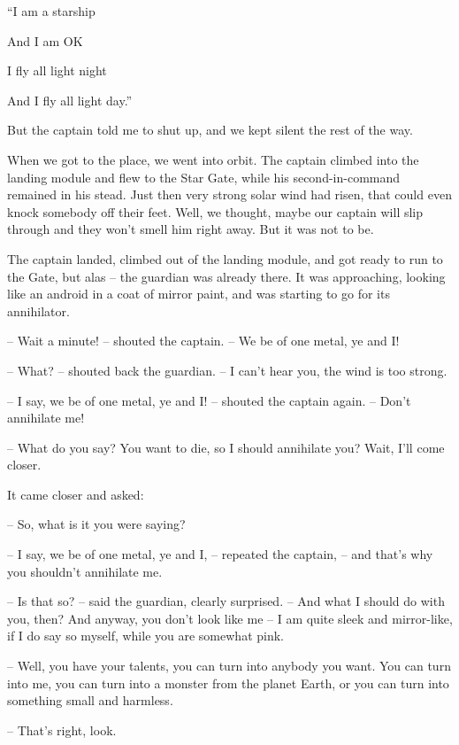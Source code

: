 \documentclass[ebook,oneside,final,openright]{memoir}
\begin{document}
“I am a starship \par
 And I am OK \par
 I fly all light night \par
 And I fly all light day.”\par
 But the captain told me to shut up, and we kept silent the rest of the way.\par
\par
When we got to the place, we went into orbit. The captain climbed into the landing module and flew to the Star Gate, while his second-in-command remained in his stead. Just then very strong solar wind had risen, that could even knock somebody off their feet. Well, we thought, maybe our captain will slip through and they won’t smell him right away. But it was not to be.\par
\par
The captain landed, climbed out of the landing module, and got ready to run to the Gate, but alas – the guardian was already there. It was approaching, looking like an android in a coat of mirror paint, and was starting to go for its annihilator.\par
– Wait a minute! – shouted the captain. – We be of one metal, ye and I!\par
– What? – shouted back the guardian. – I can’t hear you, the wind is too strong.\par
– I say, we be of one metal, ye and I! – shouted the captain again. – Don’t annihilate me!\par
– What do you say? You want to die, so I should annihilate you? Wait, I’ll come closer.\par
\par
It came closer and asked:\par
– So, what is it you were saying?\par
– I say, we be of one metal, ye and I, – repeated the captain, – and that’s why you shouldn’t annihilate me.\par
– Is that so? – said the guardian, clearly surprised. – And what I should do with you, then? And anyway, you don’t look like me – I am quite sleek and mirror-like, if I do say so myself, while you are somewhat pink.\par
– Well, you have your talents, you can turn into anybody you want. You can turn into me, you can turn into a monster from the planet Earth, or you can turn into something small and harmless.\par
– That’s right, look.\par
\par
\end{document}
